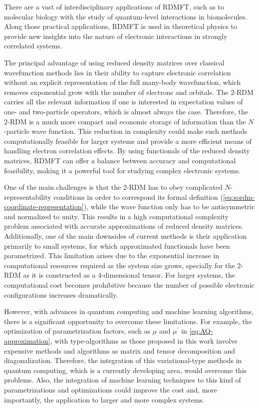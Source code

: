 There are a vast of interdisciplinary applications of RDMFT, such as
to molecular biology with the study of quantum-level interactions in biomolecules.
Along those practical applications, RDMFT is used in theoretical physics
to provide new insights into the nature of electronic interactions in strongly
correlated systems.

The principal advantage of using reduced density matrices over classical
wavefunction methods lies in their ability to capture electronic correlation 
without an explicit representation of the 
full many-body wavefunction, which removes exponential grow with the number of 
electrons and orbitals.
The 2-RDM carries all the relevant information if one is interested in
expectation values of one- and two-particle operators, which is almost always
the case.
Therefore, the 2-RDM is a much more compact and economic storage of
information than the $N$-particle wave function.
This reduction in complexity could make such methods computationally feasible
for larger systems and provide a more efficient means of handling electron
correlation effects.
By using functionals of the reduced density matrices, RDMFT can offer a 
balance between accuracy and computational feasibility, making it a powerful 
tool for studying complex electronic systems.

One of the main challenges is that the 2-RDM has to obey complicated
$N$-representability conditions in order to correspond its formal definition
(\cref{eq:sordm-coordinate-representation}), while the wave function only has
to be antisymmetric and normalized to unity.
This results in a high computational complexity problem associated with accurate
approximations of reduced density matrices.
Additionally, one of the main downsides of current methods is their 
application primarily to small systems, for which approximated functionals
have been parametrized.
This limitation arises due to the exponential increase in computational 
resources required as the system size grows, specially for the 2-RDM as it
is constructed as a 4-dimensional tensor.
For larger systems, the computational cost becomes prohibitive because the 
number of possible electronic configurations increases dramatically.

However, with advances in quantum computing and machine learning algorithms,
there is a significant opportunity to overcome these limitations.
For example, the optimization of parametrization factors, such as $\mu$ and
$\mu^{\prime}$ in \cref{eq:AQ-approximation}, with type-algorithms as those
proposed in this work involve expensive methods and algorithms as matrix and
tensor decomposition and diagonalization.
Therefore, the integration of this variational-type methods in quantum computing,
which is a currently developing area, would overcome this problems. 
Also, the integration of machine learning techniques to this kind of 
parametrizations and optimizations could improve the cost and, more importantly,
the application to larger and more complex systems.

